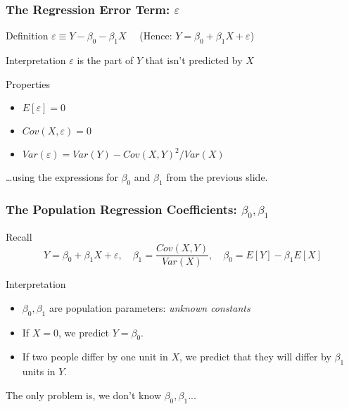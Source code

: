 \begin{frame}
  \frametitle{The Regression Error Term: $\varepsilon$}

  \begin{block}{Definition}
    $\varepsilon \equiv Y - \beta_0 - \beta_1 X\quad$ (Hence: $Y = \beta_0 + \beta_1 X + \varepsilon$)
  \end{block}

  \begin{block}{Interpretation}
    $\varepsilon$ is the part of $Y$ that isn't predicted by $X$
  \end{block}

  \begin{block}{Properties}
    \begin{itemize}
      \item $E[\varepsilon] = 0$
      \item $Cov(X,\varepsilon) = 0$
      \item $Var(\varepsilon) = Var(Y) - Cov(X,Y)^2/Var(X)$
    \end{itemize}
  \end{block}

  \alert{\dots using the expressions for $\beta_0$ and $\beta_1$ from the previous slide.}

\end{frame}
\begin{frame}
  \frametitle{The Population Regression Coefficients: $\beta_0, \beta_1$}

\begin{block}{Recall}
  \vspace{-1em}
  \[
    Y = \beta_0 + \beta_1 X + \varepsilon, \quad \beta_1 = \frac{Cov(X,Y)}{Var(X)}, \quad \beta_0 = E[Y] - \beta_1 E[X]
  \]
\end{block}

\begin{block}{Interpretation}
  \begin{itemize}
    \item $\beta_0, \beta_1$ are population parameters: \emph{unknown constants}
    \item If $X = 0$, we predict $Y = \beta_0$.
    \item If two people differ by one unit in $X$, we predict that they will differ by $\beta_1$ units in $Y$.  
  \end{itemize}
\end{block}

	\alert{The only problem is, we don't know $\beta_0, \beta_1$...}
\end{frame}
